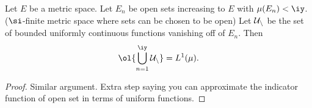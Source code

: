 \begin{thm}\label{mufinitedense}
Let $E$ be a metric space. Let $E_n$ be open sets increasing to $E$ with $\mu(E_n)<\iy$. ($\si$-finite metric space where sets can be chosen to be open) Let $\cal U_n$ be the set of bounded uniformly continuous functions vanishing off of $E_n$. 
Then
\[
\ol{\bigcup_{n=1}^{\iy} \cal U_n}=L^1(\mu).
\]
\end{thm}
\begin{proof}
Similar argument. Extra step saying you can approximate the indicator function of open set in terms of uniform functions.
\end{proof}
